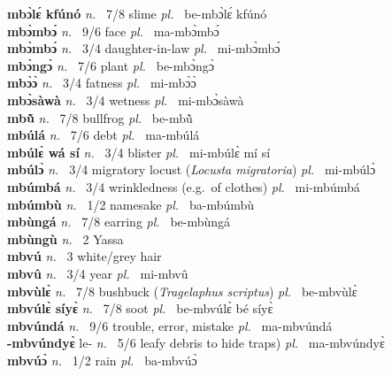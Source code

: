 {\bfseries mbɔ̀lɛ́ kfúnó}  {\itshape n.~} 7/8 slime {\itshape pl.~} be-mbɔ̀lɛ́ kfúnó    \\ 
{\bfseries mbɔ̀mbɔ́}  {\itshape n.~} 9/6 face {\itshape pl.~} ma-mbɔ̀mbɔ́    \\ 
{\bfseries mbɔ̀mbɔ́}  {\itshape n.~} 3/4 daughter-in-law {\itshape pl.~} mi-mbɔ̀mbɔ́    \\ 
{\bfseries mbɔ̀ngɔ̀}  {\itshape n.~} 7/6 plant  {\itshape pl.~} be-mbɔ̀ngɔ̀  \\ 
{\bfseries mbɔ̀ɔ̀}  {\itshape n.~} 3/4 fatness {\itshape pl.~} mi-mbɔ̀ɔ̀    \\ 
{\bfseries mbɔ̀sàwà}  {\itshape n.~} 3/4 wetness {\itshape pl.~} mi-mbɔ̀sàwà    \\ 
{\bfseries mbũ̀}  {\itshape n.~} 7/8 bullfrog {\itshape pl.~} be-mbũ̀    \\ 
{\bfseries mbúlá}  {\itshape n.~} 7/6 debt {\itshape pl.~} ma-mbúlá    \\ 
{\bfseries mbúlɛ̀ wá sí}  {\itshape n.~} 3/4 blister {\itshape pl.~} mi-mbúlɛ̀ mí sí    \\ 
{\bfseries mbúlɔ̀}  {\itshape n.~} 3/4 migratory locust ({\itshape Locusta migratoria}) {\itshape pl.~} mi-mbúlɔ̀    \\ 
{\bfseries mbúmbá}  {\itshape n.~} 3/4 wrinkledness (e.g.\ of clothes) {\itshape pl.~} mi-mbúmbá    \\ 
{\bfseries mbúmbù}  {\itshape n.~} 1/2 namesake {\itshape pl.~} ba-mbúmbù    \\ 
{\bfseries mbùngá}  {\itshape n.~} 7/8 earring {\itshape pl.~} be-mbùngá    \\ 
{\bfseries mbùngù}  {\itshape n.~} 2 Yassa    \\ 
{\bfseries mbvú}  {\itshape n.~} 3 white/grey hair    \\ 
{\bfseries mbvû}  {\itshape n.~} 3/4 year {\itshape pl.~} mi-mbvû    \\ 
{\bfseries mbvùlɛ̀}  {\itshape n.~} 7/8 bushbuck ({\itshape Tragelaphus scriptus}) {\itshape pl.~} be-mbvùlɛ̀    \\ 
{\bfseries mbvúlɛ̀ síyɛ̀}  {\itshape n.~} 7/8 soot {\itshape pl.~} be-mbvúlɛ̀ bé síyɛ̀    \\ 
{\bfseries mbvúndá}  {\itshape n.~} 9/6 trouble, error, mistake {\itshape pl.~} ma-mbvúndá    \\ 
{\bfseries -mbvúndyɛ̀} le- {\itshape n.~} 5/6 leafy debris to hide traps) {\itshape pl.~} ma-mbvúndyɛ̀    \\ 
{\bfseries mbvúɔ̀}  {\itshape n.~} 1/2 rain {\itshape pl.~} ba-mbvúɔ̀    \\ 
